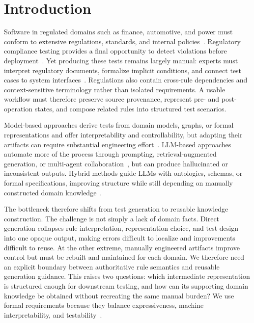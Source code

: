 \section{Introduction}
\label{sec:introduction}

Software in regulated domains such as finance, automotive, and power must
conform to extensive regulations, standards, and internal
policies~\cite{badrzadeh2015challenges,tabani2019assessing,xue2024llm4fin,zhang2025comprehensive}.
Regulatory compliance testing provides a final opportunity to detect
violations before deployment~\cite{sommerville2005ingenieria}. Yet producing
these tests remains largely manual: experts must interpret regulatory
documents, formalize implicit conditions, and connect test cases to
system interfaces~\cite{castellanos2022compliance,jain2025complexity}.
Regulations also contain cross-rule dependencies and context-sensitive
terminology rather than isolated requirements. A usable workflow must therefore
preserve source provenance, represent pre- and post-operation states, and
compose related rules into structured test scenarios.

Model-based approaches derive tests from domain models, graphs, or formal
representations and offer interpretability and controllability, but adapting
their artifacts can require substantial engineering
effort~\cite{wang2022automatic,stefani2025automated,zyberaj2025genai,yang2025llmcfg}.
LLM-based approaches automate more of the process through prompting,
retrieval-augmented generation, or multi-agent
collaboration~\cite{lewis2020retrieval,castellanos2022compliance,boukhlif2024towards,korraprolu2025test,hasan2025automatic,masuda2026generating},
but can produce hallucinated or inconsistent outputs. Hybrid methods guide
LLMs with ontologies, schemas, or formal specifications, improving structure
while still depending on manually constructed domain
knowledge~\cite{xue2024llm4fin,chen2024automated,sun2025compliance,shrestha2025less}.

The bottleneck therefore shifts from test generation to reusable knowledge
construction. The challenge is not simply a lack of domain facts. Direct
generation collapses rule interpretation, representation choice, and test
design into one opaque output, making errors difficult to localize and
improvements difficult to reuse. At the other extreme, manually engineered
artifacts improve control but must be rebuilt and maintained for each domain.
We therefore need an explicit boundary between authoritative rule semantics and
reusable generation guidance. This raises two questions: which intermediate representation is
structured enough for downstream testing, and how can its supporting domain
knowledge be obtained without recreating the same manual burden? We use formal
requirements because they balance expressiveness, machine interpretability,
and testability~\cite{gropler2021nlp,yang2025requirements}.

